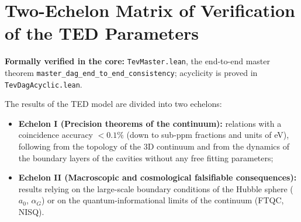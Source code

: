 \documentclass[11pt,a4paper]{article}
\theoremstyle{definition}
\theoremstyle{remark}
\begin{document}
\section{Two-Echelon Matrix of Verification of the TED Parameters}
\noindent\small\textbf{Formally verified in the core:} \texttt{TevMaster.lean}, the end-to-end master theorem \texttt{master\_dag\_end\_to\_end\_consistency}; acyclicity is proved in \texttt{TevDagAcyclic.lean}.

The results of the TED model are divided into two echelons:
\begin{itemize}
\item \textbf{Echelon I (Precision theorems of the continuum):} relations with a coincidence accuracy $< 0.1\%$ (down to sub-ppm fractions and units of eV), following from the topology of the 3D continuum and from the dynamics of the boundary layers of the cavities without any free fitting parameters;
\item \textbf{Echelon II (Macroscopic and cosmological falsifiable consequences):} results relying on the large-scale boundary conditions of the Hubble sphere ($a_0$, $\alpha_G$) or on the quantum-informational limits of the continuum (FTQC, NISQ).
\end{itemize}

\begingroup
\small
\setlength{\tabcolsep}{3.5pt}
\renewcommand{\arraystretch}{1.25}
\end{document}
